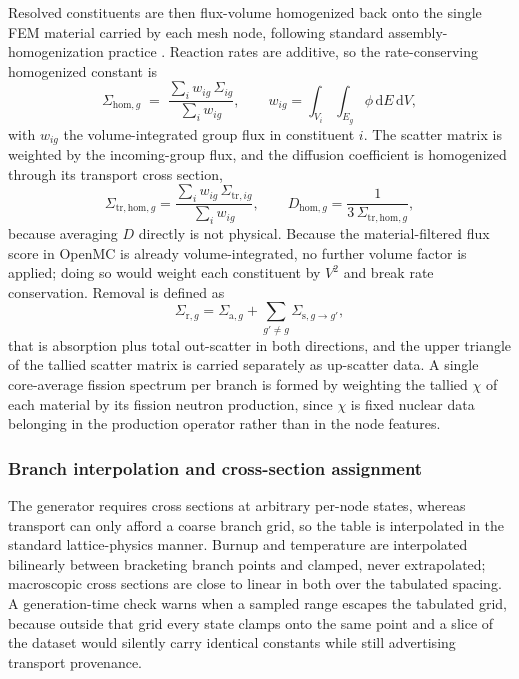 \documentclass[preprint,12pt]{elsarticle}
\newcommand{\Sig}[1]{\Sigma_{\mathrm{#1}}}
\begin{document}
Resolved constituents are then flux-volume homogenized back onto the single FEM
material carried by each mesh node, following standard assembly-homogenization
practice \citep{scale}. Reaction rates are additive, so the
rate-conserving homogenized constant is
\begin{equation}
\Sigma_{\mathrm{hom},g} \;=\;
\frac{\sum_i w_{ig}\,\Sigma_{ig}}{\sum_i w_{ig}},
\qquad
w_{ig} = \int_{V_i}\!\!\int_{E_g} \phi\,\mathrm{d}E\,\mathrm{d}V ,
\label{eq:homog}
\end{equation}
with $w_{ig}$ the volume-integrated group flux in constituent $i$. The scatter
matrix is weighted by the incoming-group flux, and the diffusion coefficient is
homogenized through its transport cross section,
\begin{equation}
\Sigma_{\mathrm{tr,hom},g} = \frac{\sum_i w_{ig}\,\Sigma_{\mathrm{tr},ig}}{\sum_i w_{ig}},
\qquad
D_{\mathrm{hom},g} = \frac{1}{3\,\Sigma_{\mathrm{tr,hom},g}},
\label{eq:dhomog}
\end{equation}
because averaging $D$ directly is not physical. Because the material-filtered
flux score in OpenMC is already volume-integrated, no further volume factor is
applied; doing so would weight each constituent by $V^2$ and break rate
conservation. Removal is defined as
\begin{equation}
\Sig{r,\mathit{g}} = \Sigma_{\mathrm{a},g} + \sum_{g'\neq g}\Sigma_{\mathrm{s},g\rightarrow g'},
\label{eq:removal}
\end{equation}
that is absorption plus total out-scatter in both directions, and the upper
triangle of the tallied scatter matrix is carried separately as up-scatter data.
A single core-average fission spectrum per branch is formed by weighting the
tallied $\chi$ of each material by its fission neutron production, since $\chi$
is fixed nuclear data belonging in the production operator rather than in the
node features.

\subsubsection{Branch interpolation and cross-section assignment}
\label{sec:branch}

The generator requires cross sections at arbitrary per-node states, whereas
transport can only afford a coarse branch grid, so the table is interpolated in
the standard lattice-physics manner. Burnup and temperature are interpolated
bilinearly between bracketing branch points and clamped, never extrapolated;
macroscopic cross sections are close to linear in both over the tabulated
spacing. A generation-time check warns when a sampled range escapes the
tabulated grid, because outside that grid every state clamps onto the same
point and a slice of the dataset would silently carry identical constants while
still advertising transport provenance.
\end{document}
